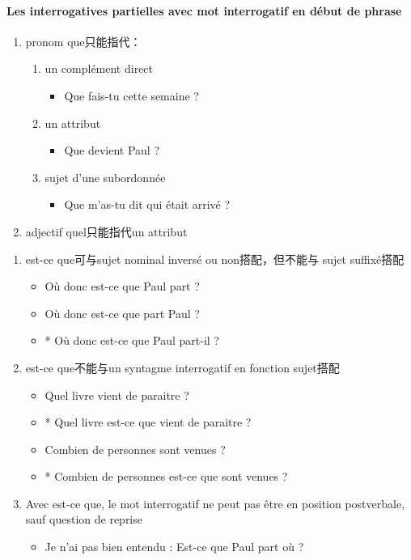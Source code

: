 \documentclass[UTF8]{report}
\begin{document}
\paragraph{Les interrogatives partielles avec mot interrogatif en début de phrase}
\begin{enumerate}
    \item pronom que只能指代：
    \begin{enumerate}
        \item un complément direct
        \begin{itemize}
            \item Que fais-tu cette semaine ?
        \end{itemize}
        \item un attribut
        \begin{itemize}
            \item Que devient Paul ?
        \end{itemize}
        \item sujet d’une subordonnée
        \begin{itemize}
            \item Que m’as-tu dit qui était arrivé ?
        \end{itemize}
    \end{enumerate}
    \item adjectif quel只能指代un attribut
\end{enumerate}


\begin{enumerate}
    \item est-ce que可与sujet nominal inversé ou non搭配，但不能与 sujet suffixé搭配
    \begin{itemize}
        \item Où donc est-ce que Paul part ?
        \item Où donc est-ce que part Paul ?
        \item * Où donc est-ce que Paul part-il ?
    \end{itemize}
    \item est-ce que不能与un syntagme interrogatif en fonction sujet搭配
    \begin{itemize}
        \item Quel livre vient de paraitre ?
        \item * Quel livre est-ce que vient de paraitre ?
        \item Combien de personnes sont venues ?
        \item * Combien de personnes est-ce que sont venues ?
    \end{itemize}
    \item Avec est-ce que, le mot interrogatif ne peut pas être en position postverbale, sauf question de reprise
    \begin{itemize}
        \item Je n’ai pas bien entendu : Est-ce que Paul part où ?
    \end{itemize}
\end{enumerate}
\end{document}
